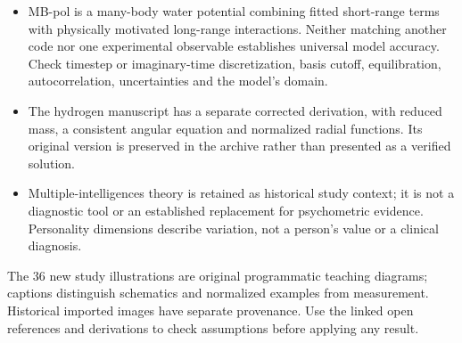 \begin{itemize}
\item MB-pol is a many-body water potential combining fitted short-range terms with physically motivated long-range interactions. Neither matching another code nor one experimental observable establishes universal model accuracy. Check timestep or imaginary-time discretization, basis cutoff, equilibration, autocorrelation, uncertainties and the model's domain.
\item The hydrogen manuscript has a separate corrected derivation, with reduced mass, a consistent angular equation and normalized radial functions. Its original version is preserved in the archive rather than presented as a verified solution.
\item Multiple-intelligences theory is retained as historical study context; it is not a diagnostic tool or an established replacement for psychometric evidence. Personality dimensions describe variation, not a person's value or a clinical diagnosis.
\end{itemize}

The 36 new study illustrations are original programmatic teaching diagrams; captions distinguish schematics and normalized examples from measurement. Historical imported images have separate provenance. Use the linked open references and derivations to check assumptions before applying any result.